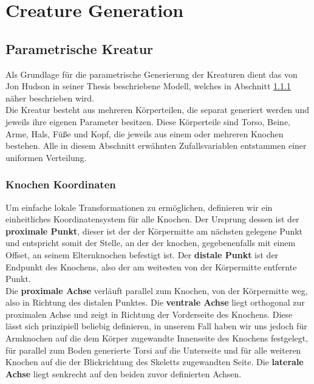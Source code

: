 \DeclarePairedDelimiter\norm{\lVert}{\rVert}

\section{Creature Generation}
\subsection{Parametrische Kreatur}
Als Grundlage für die parametrische Generierung der Kreaturen dient das von Jon Hudson in seiner Thesis \cite{Hudson2013CreatureGU} beschriebene Modell, welches in Abschnitt \ref{} näher beschrieben wird.\\
Die Kreatur besteht aus mehreren Körperteilen, die separat generiert werden und jeweils ihre eigenen Parameter besitzen. Diese Körperteile sind Torso, Beine, Arme, Hals, Füße und Kopf, die jeweils aus einem oder mehreren Knochen bestehen. Alle in diesem Abschnitt erwähnten Zufallsvariablen entstammen einer uniformen Verteilung.

\subsubsection{Knochen Koordinaten}
Um einfache lokale Transformationen zu ermöglichen, definieren wir ein einheitliches Koordinatensystem für alle Knochen. Der Ursprung dessen ist der \textbf{proximale Punkt}, dieser ist der der Körpermitte am nächsten gelegene Punkt und entspricht somit der Stelle, an der der knochen, gegebenenfalls mit einem Offset, an seinem Elternknochen befestigt ist. Der \textbf{distale Punkt} ist der Endpunkt des Knochens, also der am weitesten von der Körpermitte entfernte Punkt. \\ Die \textbf{proximale Achse} verläuft parallel zum Knochen, von der Körpermitte weg, also in Richtung des distalen Punktes. Die \textbf{ventrale Achse} liegt orthogonal zur proximalen Achse und zeigt in Richtung der Vorderseite des Knochens. Diese lässt sich prinzipiell beliebig definieren, in unserem Fall haben wir uns jedoch für Armknochen auf die dem Körper zugewandte Innenseite des Knochens festgelegt, für parallel zum Boden generierte Torsi auf die Unterseite und für alle weiteren Knochen auf die der Blickrichtung des Skeletts zugewandten Seite. Die \textbf{laterale Achse} liegt senkrecht auf den beiden zuvor definierten Achsen.

